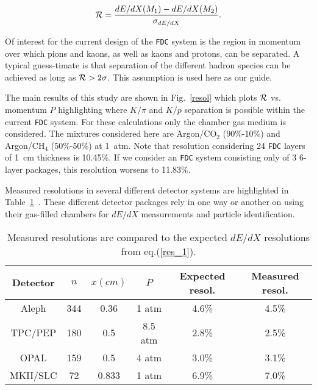 \documentclass[12pt]{article}
\begin{document}
\begin{equation}
\label{separation}
{\cal{R}} = \frac{dE/dX(M_1) - dE/dX(M_2)}{\sigma_{dE/dX}}.
\end{equation}

Of interest for the current design of the {\tt FDC} system is the region in momentum over which pions and kaons, as well as kaons and protons, can be separated.
A typical guess-timate is that separation of the different hadron species can be achieved as long as ${\cal{R}} > 2\sigma$.  This assumption is used here as our guide.

The main results of this study are shown in Fig.~\ref{resol} which plots ${\cal{R}}$ vs. momentum $P$ highlighting where $K/\pi$ and $K/p$ separation is possible within the current
{\tt FDC} system.  For these calculations only the chamber gas medium is considered.  The mixtures considered here are Argon/CO$_2$ (90\%-10\%) and Argon/CH$_4$ (50\%-50\%) at 1~atm.
Note that resolution considering 24 {\tt FDC} layers of 1~cm thickness is 10.45\%. If we consider an {\tt FDC} system consisting only of 3 6-layer packages, this resolution worsens
 to 11.83\%.

Measured resolutions in several different detector systems are highlighted in Table~\ref{sys_res}~\cite{yamamoto}.  These different detector packages rely in one way or another
 on using their gas-filled chambers for $dE/dX$ measurements and particle identification.

\begin{table}[htbp]
\begin{center}
\begin{tabular} {||c|c|c|c|c|c||} \hline \hline
Detector& $n$  & $x(cm)$ & $P$     & Expected resol.  &  Measured resol. \\ \hline 
Aleph   & 344  & 0.36    & 1 atm   & 4.6\% & 4.5\% \\
TPC/PEP & 180  & 0.5     & 8.5 atm & 2.8\% & 2.5\% \\
OPAL    & 159  & 0.5     & 4 atm   & 3.0\% & 3.1\% \\
MKII/SLC&  72  & 0.833   & 1 atm   & 6.9\% & 7.0\% \\ \hline \hline
\end{tabular}
\end{center}
\caption{\small{Measured resolutions are compared to the expected $dE/dX$ resolutions from eq.(\ref{res_1}).}}
\label{sys_res}
\end{table}
\end{document}
